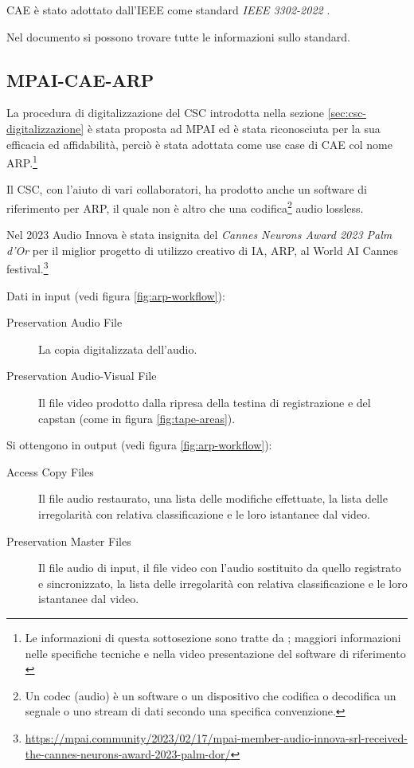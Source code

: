 \ac{CAE} è stato adottato dall'\ac{IEEE} come standard \textit{IEEE 3302-2022} \cite{ieeeStandard3302-2022}.

Nel documento  si possono trovare tutte le informazioni sullo standard.


\subsection{MPAI-CAE-ARP} \label{ssec:mpai-cae-arp} %
La procedura di digitalizzazione del \ac{CSC} introdotta nella sezione \ref{sec:csc-digitalizzazione} è stata proposta ad \ac{MPAI} ed è stata riconosciuta per la sua efficacia ed affidabilità, perciò è stata adottata come use case di \ac{CAE} col nome \acf{ARP}.\footnote{Le informazioni di questa sottosezione sono tratte da \cite{mpaiMPAIDataCoding}; maggiori informazioni nelle specifiche tecniche \cite{ieeeStandard3302-2022} e nella video presentazione del software di riferimento \cite{mpaistandardsMPAIPresentsContextbased2023}}

Il \ac{CSC}, con l'aiuto di vari collaboratori, ha prodotto anche un software di riferimento per \ac{ARP}, il quale non è altro che una codifica\footnote{Un codec (audio) è un software o un dispositivo che codifica o decodifica un segnale o uno stream di dati secondo una specifica convenzione.} audio lossless.

Nel 2023 Audio Innova è stata insignita del \textit{Cannes Neurons Award 2023 Palm d'Or} per il miglior progetto di utilizzo creativo di IA, \ac{ARP}, al World AI Cannes festival.\footnote{\url{https://mpai.community/2023/02/17/mpai-member-audio-innova-srl-received-the-cannes-neurons-award-2023-palm-dor/}}

Dati in input (vedi figura \ref{fig:arp-workflow}):
\begin{description}
    \item[Preservation Audio File] La copia digitalizzata dell'audio.
    \item[Preservation Audio-Visual File] Il file video prodotto dalla ripresa della testina di registrazione e del capstan (come in figura \ref{fig:tape-areas}).
\end{description}

Si ottengono in output (vedi figura \ref{fig:arp-workflow}):
\begin{description}
    \item[Access Copy Files] Il file audio restaurato, una lista delle modifiche effettuate, la lista delle irregolarità con relativa classificazione e le loro istantanee dal video.   %
    \item[Preservation Master Files] Il file audio di input, il file video con l'audio sostituito da quello registrato e sincronizzato, la lista delle irregolarità con relativa classificazione e le loro istantanee dal video.
\end{description}

